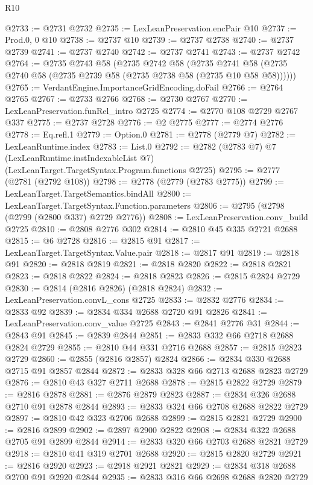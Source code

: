 \begin{lexlean}{R10}
\begin{coremodule}
@2733 := @2731 @2732
@2735 := LexLeanPreservation.encPair @10
@2737 := Prod.{0, 0} @10
@2738 := @2737 @10
@2739 := @2737 @2738
@2740 := @2737 @2739
@2741 := @2737 @2740
@2742 := @2737 @2741
@2743 := @2737 @2742
@2764 := @2735
    @2743
    @58
    (@2735
      @2742
      @58
      (@2735 @2741 @58 (@2735 @2740 @58 (@2735 @2739 @58 (@2735 @2738 @58 (@2735 @10 @58 @58))))))
@2765 := VerdantEngine.ImportanceGridEncoding.doFail
@2766 := @2764 @2765
@2767 := @2733 @2766
@2768 := @2730 @2767
@2770 := LexLeanPreservation.funRel_intro @2725
@2774 := @2770 @108 @2729 @2767 @337
@2775 := @2737 @2728
@2776 := @2 @2775
@2777 := @2774 @2776
@2778 := Eq.refl.{1}
@2779 := Option.{0}
@2781 := @2778 (@2779 @7)
@2782 := LexLeanRuntime.index
@2783 := List.{0}
@2792 := @2782
    (@2783 @7)
    @7
    (LexLeanRuntime.instIndexableList @7)
    (LexLeanTarget.TargetSyntax.Program.functions @2725)
@2795 := @2777 (@2781 (@2792 @108))
@2798 := @2778 (@2779 (@2783 @2775))
@2799 := LexLeanTarget.TargetSemantics.bindAll
@2800 := LexLeanTarget.TargetSyntax.Function.parameters
@2806 := @2795 (@2798 (@2799 (@2800 @337) @2729 @2776))
@2808 := LexLeanPreservation.conv_build @2725
@2810 := @2808 @2776 @302
@2814 := @2810 @45 @335 @2721 @2688
@2815 := @6 @2728
@2816 := @2815 @91
@2817 := LexLeanTarget.TargetSyntax.Value.pair
@2818 := @2817 @91
@2819 := @2818 @91
@2820 := @2818 @2819
@2821 := @2818 @2820
@2822 := @2818 @2821
@2823 := @2818 @2822
@2824 := @2818 @2823
@2826 := @2815 @2824 @2729
@2830 := @2814 (@2816 @2826) (@2818 @2824)
@2832 := LexLeanPreservation.convL_cons @2725
@2833 := @2832 @2776
@2834 := @2833 @92
@2839 := @2834 @334 @2688 @2720 @91 @2826
@2841 := LexLeanPreservation.conv_value @2725
@2843 := @2841 @2776 @31
@2844 := @2843 @91
@2845 := @2839 @2844
@2851 := @2833 @332 @66 @2718 @2688 @2824 @2729
@2855 := @2810 @44 @331 @2716 @2688
@2857 := @2815 @2823 @2729
@2860 := @2855 (@2816 @2857) @2824
@2866 := @2834 @330 @2688 @2715 @91 @2857 @2844
@2872 := @2833 @328 @66 @2713 @2688 @2823 @2729
@2876 := @2810 @43 @327 @2711 @2688
@2878 := @2815 @2822 @2729
@2879 := @2816 @2878
@2881 := @2876 @2879 @2823
@2887 := @2834 @326 @2688 @2710 @91 @2878 @2844
@2893 := @2833 @324 @66 @2708 @2688 @2822 @2729
@2897 := @2810 @42 @323 @2706 @2688
@2899 := @2815 @2821 @2729
@2900 := @2816 @2899
@2902 := @2897 @2900 @2822
@2908 := @2834 @322 @2688 @2705 @91 @2899 @2844
@2914 := @2833 @320 @66 @2703 @2688 @2821 @2729
@2918 := @2810 @41 @319 @2701 @2688
@2920 := @2815 @2820 @2729
@2921 := @2816 @2920
@2923 := @2918 @2921 @2821
@2929 := @2834 @318 @2688 @2700 @91 @2920 @2844
@2935 := @2833 @316 @66 @2698 @2688 @2820 @2729

\end{coremodule}
\end{lexlean}
